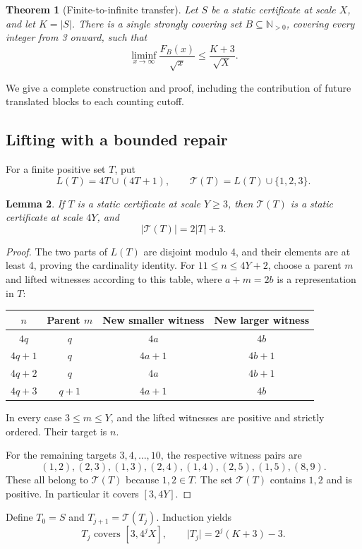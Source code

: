 \documentclass[11pt]{article}
\newtheorem{theorem}{Theorem}[section]
\newtheorem{lemma}[theorem]{Lemma}
\theoremstyle{definition}\newtheorem{definition}[theorem]{Definition}
\theoremstyle{remark}\newtheorem{remark}[theorem]{Remark}
\numberwithin{equation}{section}
\newcommand{\Np}{\mathbb N_{>0}}
\newcommand{\card}[1]{\lvert #1\rvert}
\newcommand{\lf}{\mathcal T}
\begin{document}
\begin{theorem}[Finite-to-infinite transfer]\label{thm:transfer}
Let $S$ be a static certificate at scale $X$, and let $K=\card S$. There is a single strongly covering set $B\subseteq\Np$, covering every integer from 3 onward, such that
\[
\liminf_{x\to\infty}\frac{F_B(x)}{\sqrt{x}}\le\frac{K+3}{\sqrt X}.
\]
\end{theorem}
We give a complete construction and proof, including the contribution of future translated blocks to each counting cutoff.

\subsection{Lifting with a bounded repair}
For a finite positive set $T$, put
\[
L(T)=4T\cup(4T+1),\qquad
\lf(T)=L(T)\cup\{1,2,3\}.
\]
\begin{lemma}\label{lem:lift4}
If $T$ is a static certificate at scale $Y\ge3$, then $\lf(T)$ is a static certificate at scale $4Y$, and
\[
\card{\lf(T)}=2\card T+3.
\]
\end{lemma}
\begin{proof}
The two parts of $L(T)$ are disjoint modulo 4, and their elements are at least 4, proving the cardinality identity. For $11\le n\le4Y+2$, choose a parent $m$ and lifted witnesses according to this table, where $a+m=2b$ is a representation in $T$:
\begin{center}
\begin{tabular}{cccc}
\toprule
$n$ & Parent $m$ & New smaller witness & New larger witness\\
\midrule
$4q$ & $q$ & $4a$ & $4b$\\
$4q+1$ & $q$ & $4a+1$ & $4b+1$\\
$4q+2$ & $q$ & $4a$ & $4b+1$\\
$4q+3$ & $q+1$ & $4a+1$ & $4b$\\
\bottomrule
\end{tabular}
\end{center}
In every case $3\le m\le Y$, and the lifted witnesses are positive and strictly ordered. Their target is $n$.

For the remaining targets $3,4,\ldots,10$, the respective witness pairs are
\[
(1,2),(2,3),(1,3),(2,4),(1,4),(2,5),(1,5),(8,9).
\]
These all belong to $\lf(T)$ because $1,2\in T$. The set $\lf(T)$ contains $1,2$ and is positive. In particular it covers $[3,4Y]$.
\end{proof}

Define $T_0=S$ and $T_{j+1}=\lf(T_j)$. Induction yields
\begin{equation}\label{eq:iter}
T_j\text{ covers }[3,4^jX],\qquad
\card{T_j}=2^j(K+3)-3.
\end{equation}
\end{document}

